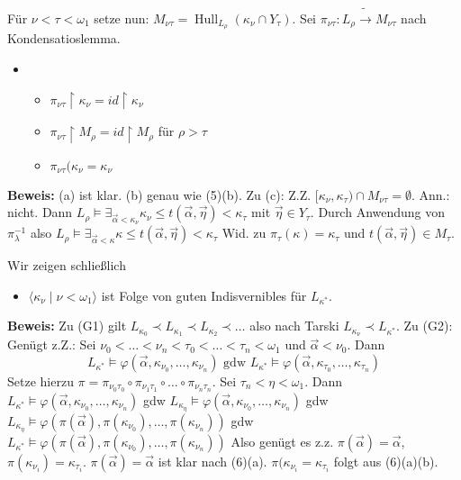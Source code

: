 \documentclass[a4paper,fontsize=11pt]{scrartcl}
\newcommand{\Hull}{\operatorname{Hull}}
\begin{document}
		Für $\nu<\tau<\omega_1$ setze nun: $M_{\nu\tau}=\Hull_{L_{\rho}}(\kappa_{\nu}\cap Y_{\tau})$.
		Sei $\pi_{\nu\tau}\colon L_{\rho}\tilde\to M_{\nu\tau}$ nach Kondensatioslemma.
		\begin{itemize}
			\item[(6)] \begin{itemize}
					\item[(a)] $\pi_{\nu\tau}\upharpoonright \kappa_{\nu} = id\upharpoonright \kappa_{\nu}$
					\item[(b)] $\pi_{\nu\tau}\upharpoonright M_{\rho} = id\upharpoonright M_{\rho}$ für $\rho>\tau$
					\item[(c)] $\pi_{\nu\tau}(\kappa_{\nu}=\kappa_{\nu}$
				\end{itemize}
		\end{itemize}
					
		{\bf Beweis:} (a) ist klar. (b) genau wie (5)(b). 
			Zu (c): Z.Z. $[\kappa_{\nu},\kappa_{\tau})\cap M_{\nu\tau}=\emptyset$.
			Ann.: nicht.
			Dann $L_{\rho}\models\exists_{\vec\alpha<\kappa_{\nu}} \kappa_{\nu}\le t(\vec\alpha,\vec\eta)<\kappa_{\tau}$ mit $\vec\eta\in Y_{\tau}$.
			Durch Anwendung von $\pi^{-1}_{\lambda}$ also $L_{\rho}\models\exists_{\vec\alpha<\kappa} \kappa\le t(\vec\alpha,\vec\eta)<\kappa_{\tau}$
			Wid. zu $\pi_{\tau}(\kappa)=\kappa_{\tau}$ und $t(\vec\alpha,\vec\eta)\in M_{\tau}$.
			
		Wir zeigen schließlich \begin{itemize}
			\item[(7)] $\langle \kappa_{\nu}\mid \nu<\omega_1\rangle$ ist Folge von guten Indisvernibles für $L_{\kappa^*}$.
		\end{itemize}
		{\bf Beweis:} Zu (G1) gilt $L_{\kappa_0}\prec L_{\kappa_1}\prec L_{\kappa_2}\prec\ldots$ also nach Tarski $L_{\kappa_{\nu}}\prec L_{\kappa^*}$.
		Zu (G2): Genügt z.Z.: Sei $\nu_0<\ldots<\nu_n<\tau_0<\ldots<\tau_n<\omega_1$ und $\vec\alpha<\nu_0$.
		Dann \[ L_{\kappa^*}\models \varphi(\vec\alpha,\kappa_{\nu_0},\ldots,\kappa_{\nu_n}) \mbox{ gdw } 
								L_{\kappa^*}\models\varphi(\vec\alpha, \kappa_{\tau_0},\ldots, \kappa_{\tau_n})\]
		Setze hierzu $\pi=\pi_{\nu_0\tau_0}\circ\pi_{\nu_1\tau_1}\circ\ldots\circ\pi_{\nu_n\tau_n}$.
		Sei $\tau_n<\eta<\omega_1$.
		Dann $L_{\kappa^*}\models\varphi(\vec\alpha,\kappa_{\nu_0},\ldots,\kappa_{\nu_n})$ gdw 
				$L_{\kappa_{\eta}}\models \varphi(\vec\alpha,\kappa_{\nu_0},\ldots,\kappa_{\nu_n})$ gdw
				$L_{\kappa_{\eta}}\models \varphi(\pi(\vec\alpha),\pi(\kappa_{\nu_0}),\ldots,\pi(\kappa_{\nu_n}))$ gdw
				$L_{\kappa^*}\models \varphi(\pi(\vec\alpha),\pi(\kappa_{\nu_0}),\ldots,\pi(\kappa_{\nu_n}))$
		Also genügt es z.z. $\pi(\vec\alpha)=\vec\alpha$, $\pi(\kappa_{\nu_i})=\kappa_{\tau_i}$.
		$\pi(\vec\alpha)=\vec\alpha$ ist klar nach (6)(a).
		$\pi(\kappa_{\nu_i}=\kappa_{\tau_i}$ folgt aus (6)(a)(b).
		
		
\end{document}
